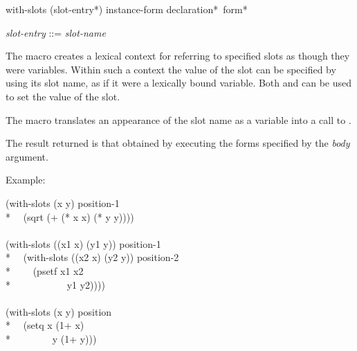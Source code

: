 \begin{defmac}
with-slots ({slot-entry}*) instance-form {declaration}* {\,form}*

\begin{tabbing}
\emph{slot-entry\/} ::= \emph{slot-name\/} {\Mor} 
\end{tabbing}
The macro  creates a lexical context for referring to
specified slots as though they were variables.  Within such a context
the value of the slot can be specified by using its slot name, as if
it were a lexically bound variable.  Both  and 
can be used to set the value of the slot.

The macro  translates an appearance of the slot name as
a variable into a call to .

  



The result returned is that obtained by executing the forms specified
by the \emph{body\/} argument.

Example:

\begin{lisp}
(with-slots (x y) position-1 \\*
~~(sqrt (+ (* x x) (* y y)))) \\
\\
(with-slots ((x1 x) (y1 y)) position-1 \\*
~~(with-slots ((x2 x) (y2 y)) position-2 \\*
~~~~(psetf x1 x2 \\*
~~~~~~~~~~~y1 y2)))) \\
\\
(with-slots (x y) position \\*
~~(setq x (1+ x) \\*
~~~~~~~~y (1+ y)))
\end{lisp}



\end{defmac}
